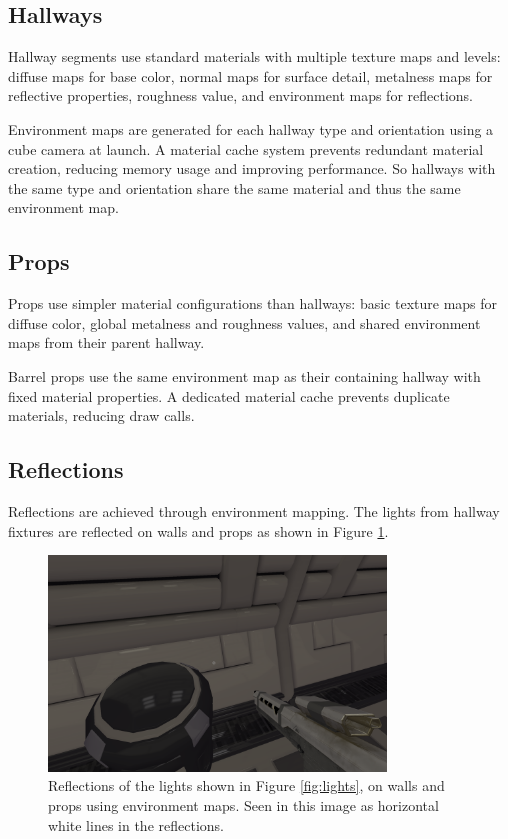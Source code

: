 \documentclass{article}
\begin{document}
\subsection{Hallways}
Hallway segments use standard materials with multiple texture maps and levels: diffuse maps for base color, normal maps for surface detail, metalness maps for reflective properties, roughness value, and environment maps for reflections.

Environment maps are generated for each hallway type and orientation using a cube camera at launch. A material cache system prevents redundant material creation, reducing memory usage and improving performance. So hallways with the same type and orientation share the same material and thus the same environment map.

\subsection{Props}
Props use simpler material configurations than hallways: basic texture maps for diffuse color, global metalness and roughness values, and shared environment maps from their parent hallway.

Barrel props use the same environment map as their containing hallway with fixed material properties. A dedicated material cache prevents duplicate materials, reducing draw calls.

\subsection{Reflections}
Reflections are achieved through environment mapping. The lights from hallway fixtures are reflected on walls and props as shown in Figure \ref{fig:reflections}.

\begin{figure}[h]
\centering
\includegraphics[width=0.8\textwidth]{diagrams/reflection.png}
\caption{Reflections of the lights shown in Figure \ref{fig:lights}, on walls and props using environment maps. Seen in this image as horizontal white lines in the reflections.}
\label{fig:reflections}
\end{figure}
\end{document}
